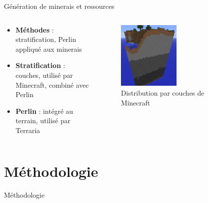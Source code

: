 \documentclass[aspectratio=169]{beamer}
\begin{document}
\begin{frame}{Génération de minerais et ressources}
    \begin{columns}
        \centering
        \begin{column}{0.5\textwidth}
            \centering
            \begin{itemize}
                \item \textbf{Méthodes} : stratification, Perlin appliqué aux minerais
                \item \textbf{Stratification} : couches, utilisé par Minecraft, combiné avec Perlin
                \item \textbf{Perlin} : intégré au terrain, utilisé par Terraria
            \end{itemize}
        \end{column}
        \begin{column}{0.5\textwidth}
            \centering
            \begin{figure}
                \centering
                \captionsetup{format=sanslabel}
                \includegraphics[width=0.5\textwidth]{assets/stratification.png}
                \caption{Distribution par couches de Minecraft}
            \end{figure}
        \end{column}
    \end{columns}
\end{frame}


\section{Méthodologie}

\begin{frame}{Méthodologie}
    \tableofcontents[sections={3}]
\end{frame}
\end{document}
